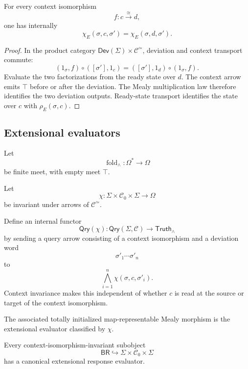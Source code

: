 \begin{proposition}
\label{prop:context-invariance}
For every context isomorphism
\[
  f:c\overset{\cong}{\longrightarrow}d,
\]
one has internally
\[
  \chi_E(\sigma,c,\sigma')
  =
  \chi_E(\sigma,d,\sigma').
\]
\end{proposition}

\begin{proof}
In the product category
\(\mathsf{Dev}(\Sigma)\times\mathcal C^\simeq\), deviation and context transport commute:
\[
  (1_\sigma,f)\circ([\sigma'],1_c)
  =
  ([\sigma'],1_d)\circ(1_\sigma,f).
\]
Evaluate the two factorizations from the ready state over \(d\). The context arrow emits
\(\top\) before or after the deviation. The Mealy multiplication law therefore identifies the two
deviation outputs. Ready-state transport identifies the state over \(c\) with
\(\rho_E(\sigma,c)\).
\end{proof}

\subsection{Extensional evaluators}

Let
\[
  \operatorname{fold}_\wedge:
  \Omega^\ast\longrightarrow\Omega
\]
be finite meet, with empty meet \(\top\).

\begin{definition}
\label{def:extensional-response-evaluator}
Let
\[
  \chi:
  \Sigma\times\mathcal C_0\times\Sigma
  \longrightarrow
  \Omega
\]
be invariant under arrows of \(\mathcal C^\simeq\).

Define an internal functor
\[
  \mathsf{Qry}(\chi):
  \mathsf{Qry}(\Sigma,\mathcal C)
  \longrightarrow
  \mathsf{Truth}_\wedge
\]
by sending a query arrow consisting of a context isomorphism and a deviation word
\[
  \sigma'_1\cdots\sigma'_n
\]
to
\[
  \bigwedge_{i=1}^{n}
  \chi(\sigma,c,\sigma'_i).
\]
Context invariance makes this independent of whether \(c\) is read at the source or target of the
context isomorphism.

The associated totally initialized map-representable Mealy morphism is the extensional evaluator
classified by \(\chi\).
\end{definition}

\begin{proposition}
\label{prop:canonical-extensional-realization}
Every context-isomorphism-invariant subobject
\[
  \mathsf{BR}
  \hookrightarrow
  \Sigma\times\mathcal C_0\times\Sigma
\]
has a canonical extensional response evaluator.
\end{proposition}

